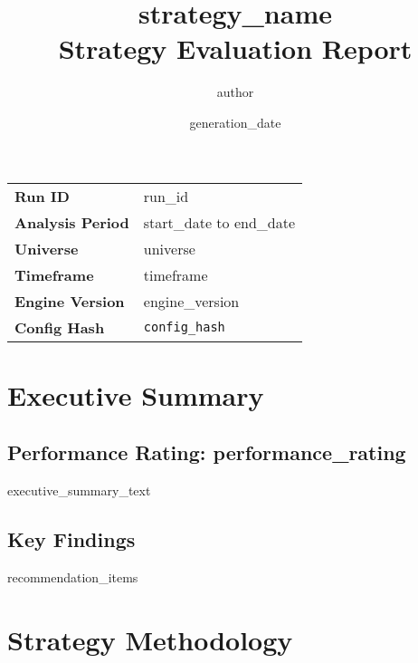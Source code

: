 \documentclass[11pt,a4paper]{article}
\title{\textbf{{{strategy_name}}}\\[0.5em]\Large Strategy Evaluation Report}
\author{{{author}}}
\date{{{generation_date}}}
\begin{document}
\maketitle
\thispagestyle{empty}

\vspace{1em}
\begin{center}
\begin{tabular}{|l|l|}
\hline
\textbf{Run ID} & {{run_id}} \\
\textbf{Analysis Period} & {{start_date}} to {{end_date}} \\
\textbf{Universe} & {{universe}} \\
\textbf{Timeframe} & {{timeframe}} \\
\textbf{Engine Version} & {{engine_version}} \\
\textbf{Config Hash} & \texttt{{{config_hash}}} \\
\hline
\end{tabular}
\end{center}

\newpage

\section{Executive Summary}

\subsection{Performance Rating: {{performance_rating}}}

{{executive_summary_text}}

\subsection{Key Findings}
\begin{itemize}
{{recommendation_items}}
\end{itemize}

\section{Strategy Methodology}
\end{document}
